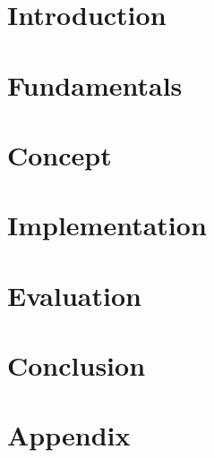 \documentclass[10pt,twoside]{report}
\title{\thesisTitle}
\author{\thesisAuthor}
\date{\today}
\begin{document}




\chapter*{}



\tableofcontents{}

\chapter{Introduction}
\label{chapter:introduction}


\chapter{Fundamentals}
\label{chapter:fundamentals}


\chapter{Concept}
\label{chapter:concept}


\chapter{Implementation}
\label{chapter:implementation}


\chapter{Evaluation}
\label{chapter:testing_and_evaluation}


\chapter{Conclusion}
\label{chapter:conclussion}


\newpage

\listoffigures{}

\lstlistoflistings
{}
\printglossaries


\nocite{*}
\printbibliography{}

\newpage
\appendix{}
\chapter{Appendix}

\end{document}

